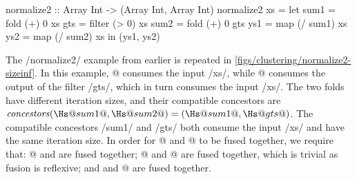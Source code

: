 
\begin{haskell}[float,label=figs/clustering/normalize2-sizeinf,caption=Normalize2 function]
normalize2 :: Array Int -> (Array Int, Array Int)
normalize2 xs
 = let sum1 = fold   (+)  0   xs
       gts  = filter (>   0)  xs
       sum2 = fold   (+)  0   gts
       ys1  = map    (/ sum1) xs
       ys2  = map    (/ sum2) xs
   in (ys1, ys2)
\end{haskell}

The \Hs/normalize2/ example from earlier is repeated in \cref{figs/clustering/normalize2-sizeinf}.
In this example, @ consumes the input \Hs/xs/, while @ consumes the output of the filter \Hs/gts/, which in turn consumes the input \Hs/xs/.
The two folds have different iteration sizes, and their compatible concestors are $\concestors(\Hs@sum1@, \Hs@sum2@) = (\Hs@sum1@, \Hs@gts@)$.
The compatible concestors \Hs/sum1/ and \Hs/gts/ both consume the input \Hs/xs/ and have the same iteration size.
In order for @ and @ to be fused together, we require that: @ and \Hs@gts@ are fused together; @ and @ are fused together, which is trivial as fusion is reflexive;  and \Hs@gts@ and @ are fused together.

